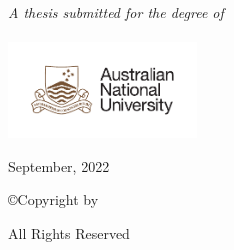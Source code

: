 \begin{titlepage}
\begin{center}

\large \textit{A thesis submitted for the degree of \degreename}\\[0.7cm] %
\deptname\\ %


\includegraphics[width=5cm]{gfx/ANU_LOGO_cmyk_56mm}

{\normalsize September, 2022}\\[2cm] %
\vspace*{\fill}

\copyright Copyright by 

All Rights Reserved
\end{center}

\end{titlepage}


